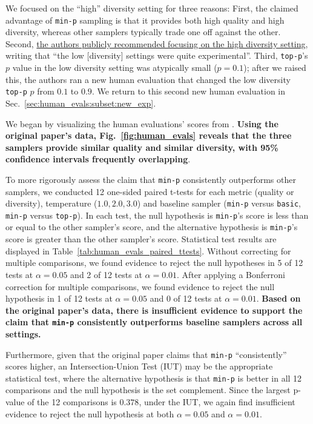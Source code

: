 We focused on the ``high'' diversity setting for three reasons: 
First, the claimed advantage of \texttt{min-p} sampling is that it provides both high quality and high diversity, whereas other samplers typically trade one off against the other. Second, \href{https://github.com/menhguin/minp_paper/issues/4}{the authors publicly recommended focusing on the high diversity setting}, writing that ``the low [diversity] settings were quite experimental''. Third, \texttt{top-p}'s $p$ value in the low diversity setting was atypically small ($p=0.1$); after we raised this, the authors ran a new human evaluation that changed the low diversity \texttt{top-p} $p$ from $0.1$ to $0.9$. We return to this second new human evaluation in Sec.~\ref{sec:human_evals:subset:new_exp}.

We began by visualizing the human evaluations' scores from \citet{nguyen2024minp}. \textbf{Using the original paper's data, Fig.~\ref{fig:human_evals} reveals that the three samplers provide similar quality and similar diversity, with 95\% confidence intervals frequently overlapping}.

To more rigorously assess the claim that \texttt{min-p} consistently outperforms other samplers, we conducted 12 one-sided paired t-tests for each metric (quality or diversity), temperature ($1.0, 2.0, 3.0$) and baseline sampler (\texttt{min-p} versus \texttt{basic}, \texttt{min-p} versus \texttt{top-p}). In each test, the null hypothesis is \texttt{min-p}'s score is less than or equal to the other sampler's score, and the alternative hypothesis is \texttt{min-p}'s score is greater than the other sampler's score.
Statistical test results are displayed in Table~\ref{tab:human_evals_paired_ttests}.
Without correcting for multiple comparisons, we found evidence to reject the null hypotheses in 5 of 12 tests at $\alpha=0.05$ and 2 of 12 tests at $\alpha=0.01$. After applying a Bonferroni correction for multiple comparisons, we found evidence to reject the null hypothesis in 1 of 12 tests at $\alpha=0.05$ and 0 of 12 tests at $\alpha=0.01$.
\textbf{Based on the original paper's data, there is insufficient evidence to support the claim that \texttt{min-p} consistently outperforms baseline samplers across all settings.}

Furthermore, given that the original paper claims that \texttt{min-p} ``consistently'' scores higher, an Intersection-Union Test (IUT) may be the appropriate statistical test, where the alternative hypothesis is that \texttt{min-p} is better in all 12 comparisons and the null hypothesis is the set complement. Since the largest p-value of the 12 comparisons is $0.378$, under the IUT, we again find insufficient evidence to reject the null hypothesis at both $\alpha=0.05$ and $\alpha=0.01$.

